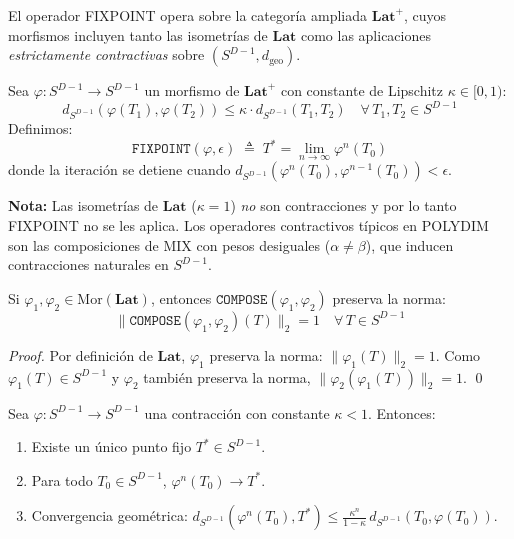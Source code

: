 \begin{definition}

El operador FIXPOINT opera sobre la categoría ampliada 
$\mathbf{Lat}^{+}$, cuyos morfismos incluyen tanto las isometrías
de $\mathbf{Lat}$ como las aplicaciones \emph{estrictamente 
contractivas} sobre $(S^{D-1}, d_{\text{geo}})$.

Sea $\varphi: S^{D-1} \to S^{D-1}$ un morfismo de $\mathbf{Lat}^{+}$
con constante de Lipschitz $\kappa \in [0, 1)$:
\begin{equation}
d_{S^{D-1}}(\varphi(T_1), \varphi(T_2)) \leq \kappa \cdot d_{S^{D-1}}(T_1, T_2) 
\quad \forall\, T_1, T_2 \in S^{D-1}
\end{equation}
Definimos:
\begin{equation}
\texttt{FIXPOINT}(\varphi, \epsilon) \;\triangleq\; 
T^* = \lim_{n \to \infty} \varphi^n(T_0)
\end{equation}
donde la iteración se detiene cuando 
$d_{S^{D-1}}(\varphi^n(T_0), \varphi^{n-1}(T_0)) < \epsilon$.

\textbf{Nota:} Las isometrías de $\mathbf{Lat}$ ($\kappa = 1$) 
\emph{no} son contracciones y por lo tanto FIXPOINT no se les aplica.
Los operadores contractivos típicos en POLYDIM son las composiciones
de MIX con pesos desiguales ($\alpha \neq \beta$), que inducen
contracciones naturales en $S^{D-1}$.
\end{definition}

\begin{lemma}

Si $\varphi_1, \varphi_2 \in \text{Mor}(\mathbf{Lat})$, entonces
$\texttt{COMPOSE}(\varphi_1, \varphi_2)$ preserva la norma:
\begin{equation}
\|\texttt{COMPOSE}(\varphi_1, \varphi_2)(T)\|_2 = 1 \quad 
\forall\, T \in S^{D-1}
\end{equation}
\end{lemma}

\begin{proof}
Por definición de $\mathbf{Lat}$, $\varphi_1$ preserva la norma: 
$\|\varphi_1(T)\|_2 = 1$. Como $\varphi_1(T) \in S^{D-1}$ y $\varphi_2$ 
también preserva la norma, $\|\varphi_2(\varphi_1(T))\|_2 = 1$. \qed
\end{proof}

\begin{lemma}

Sea $\varphi: S^{D-1} \to S^{D-1}$ una contracción con constante 
$\kappa < 1$. Entonces:
\begin{enumerate}
    \item Existe un único punto fijo $T^* \in S^{D-1}$.
    \item Para todo $T_0 \in S^{D-1}$, $\varphi^n(T_0) \to T^*$.
    \item Convergencia geométrica:
    $d_{S^{D-1}}(\varphi^n(T_0), T^*) \leq \frac{\kappa^n}{1 - \kappa}\, 
    d_{S^{D-1}}(T_0, \varphi(T_0))$.
\end{enumerate}
\end{lemma}

